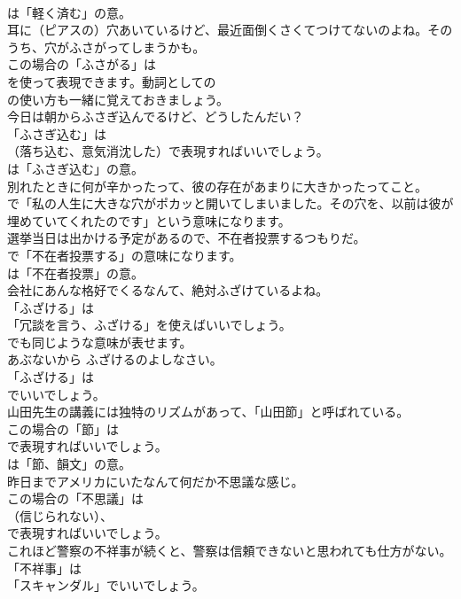 \documentclass[8pt]{extreport}
\begin{document}
\begin{CJK}{UTF8}{min}
\\	は「軽く済む」の意。	
\\	耳に（ピアスの）穴あいているけど、最近面倒くさくてつけてないのよね。そのうち、穴がふさがってしまうかも。 
\\	この場合の「ふさがる」は
\\	を使って表現できます。動詞としての
\\	の使い方も一緒に覚えておきましょう。	
\\	今日は朝からふさぎ込んでるけど、どうしたんだい？ 
\\	「ふさぎ込む」は 
\\	（落ち込む、意気消沈した）で表現すればいいでしょう。
\\	は「ふさぎ込む」の意。	
\\	別れたときに何が辛かったって、彼の存在があまりに大きかったってこと。 
\\	で「私の人生に大きな穴がポカッと開いてしまいました。その穴を、以前は彼が埋めていてくれたのです」という意味になります。	
\\	選挙当日は出かける予定があるので、不在者投票するつもりだ。 
\\	で「不在者投票する」の意味になります。
\\	は「不在者投票」の意。	
\\	会社にあんな格好でくるなんて、絶対ふざけているよね。 
\\	「ふざける」は
\\	「冗談を言う、ふざける」を使えばいいでしょう。
\\	でも同じような意味が表せます。	
\\	あぶないから ふざけるのよしなさい。 
\\	「ふざける」は
\\	でいいでしょう。	
\\	山田先生の講義には独特のリズムがあって、「山田節」と呼ばれている。 
\\	この場合の「節」は
\\	で表現すればいいでしょう。
\\	は「節、韻文」の意。	
\\	昨日までアメリカにいたなんて何だか不思議な感じ。 
\\	この場合の「不思議」は 
\\	（信じられない）、
\\	で表現すればいいでしょう。	
\\	これほど警察の不祥事が続くと、警察は信頼できないと思われても仕方がない。 
\\	「不祥事」は
\\	「スキャンダル」でいいでしょう。

\end{CJK}
\end{document}
